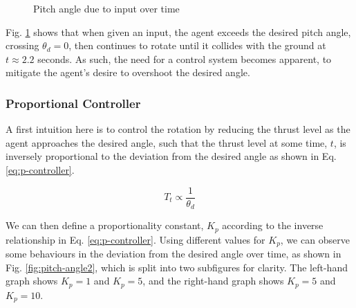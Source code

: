 \documentclass[12pt]{article}
\begin{document}
\begin{figure}[ht]
\centering
{}
\caption{Pitch angle due to input over time}
\label{fig:pitch-angle}
\end{figure}

Fig. \ref{fig:pitch-angle} shows that when given an input, the agent exceeds the desired pitch angle, crossing $\theta_d = 0$, then continues to rotate until it collides with the ground at $t \approx 2.2$ seconds. As such, the need for a control system becomes apparent, to mitigate the agent's desire to overshoot the desired angle.

\subsubsection{Proportional Controller}
A first intuition here is to control the rotation by reducing the thrust level as the agent approaches the desired angle, such that the thrust level at some time, $t$, is inversely proportional to the deviation from the desired angle as shown in Eq. \ref{eq:p-controller}.

\begin{equation}
    T_t \propto \frac{1}{\theta_d}
    \label{eq:p-controller}
\end{equation}

We can then define a proportionality constant, $K_p$ according to the inverse relationship in Eq. \ref{eq:p-controller}. Using different values for $K_p$, we can observe some behaviours in the deviation from the desired angle over time, as shown in Fig. \ref{fig:pitch-angle2}, which is split into two subfigures for clarity. The left-hand graph shows $K_p = 1$ and $K_p = 5$, and the right-hand graph shows $K_p = 5$ and $K_p = 10$.
\end{document}
